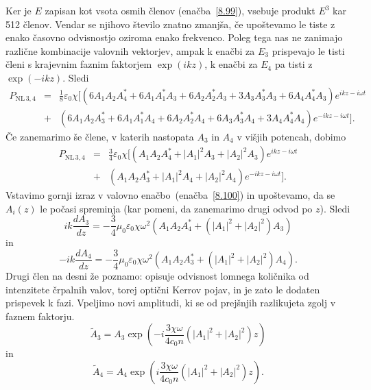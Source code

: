 Ker je $E$ zapisan kot vsota osmih členov
(enačba~\ref{8.99}), vsebuje produkt $E^3$ kar 512 členov. Vendar se njihovo število znatno zmanjša, 
če upoštevamo le tiste z enako časovno odvisnostjo oziroma enako frekvenco.
Poleg tega nas ne zanimajo različne kombinacije valovnih vektorjev, ampak k enačbi za $E_{3}$ 
prispevajo le tisti členi s krajevnim faznim faktorjem $\exp(ikz)$, 
k enačbi za $E_4$ pa tisti z $\exp(-ikz)$. Sledi
\begin{eqnarray}
P_{\mathrm{NL}\,3,4} &=& \frac{1}{8}\varepsilon_0\chi [
\left(6 A_1 A_2 A_4^*+ 6A_1 A_1^*A_3 + 6A_2A_2^*A_3 + 3 A_3A_3^*A_3 + 6 A_4 A_4^* A_3\right)
e^{i k z - i\omega t} \nonumber\\
&+& 
\left(6 A_1 A_2 A_3^*+6 A_1 A_1^*A_4 + 6A_2A_2^*A_4 + 6 A_3A_3^*A_4 + 3 A_4 A_4^* A_4\right)
e^{-i k z - i\omega t}].
\end{eqnarray}
Če zanemarimo še člene, v katerih nastopata $A_3$ in $A_4$ v višjih potencah, dobimo
\begin{eqnarray}
P_{\mathrm{NL}\,3,4} &=& \frac{3}{4}\varepsilon_0\chi [
\left( A_1 A_2 A_4^*+ |A_1|^2 A_3 + |A_2|^2 A_3 \right)
e^{i k z - i\omega t} \nonumber\\
&+& 
\left( A_1 A_2 A_3^*+|A_1|^2 A_4 + |A_2|^2A_4 \right)
e^{-i k z - i\omega t}].
\end{eqnarray}
Vstavimo gornji izraz v valovno enačbo~(enačba~\ref{8.100}) in upoštevamo, 
da se $A_i(z)$ le počasi 
spreminja (kar pomeni, da zanemarimo drugi odvod po $z$). Sledi 
\begin{equation}
i k \frac{dA_3}{dz} = - \frac{3}{4} \mu_0\varepsilon_0 \chi \omega^2 
\left( A_1 A_2 A_4^*+ (|A_1|^2 + |A_2|^2) A_3 \right)
\label{eq:opc1}
\end{equation}
in 
\begin{equation}
-i k \frac{dA_4}{dz} = - \frac{3}{4} \mu_0\varepsilon_0 \chi \omega^2 
\left( A_1 A_2 A_3^*+ (|A_1|^2 + |A_2|^2) A_4 \right).
\label{eq:opc2}
\end{equation}
Drugi člen na desni že poznamo: opisuje odvisnost lomnega količnika
od intenzitete črpalnih valov, torej optični Kerrov
pojav, in je zato le dodaten prispevek
k fazi. Vpeljimo novi amplitudi, ki se od prejšnjih razlikujeta zgolj v faznem faktorju.
\begin{equation}
\tilde{A}_3 = A_3 \exp\left(-i\frac{ 3 \chi \omega}{4 c_0 n}(|A_1|^2 + |A_2|^2) z\right)
\end{equation}
in 
\begin{equation}
\tilde{A}_4 = A_4 \exp\left(i\frac{ 3 \chi \omega}{4 c_0 n}(|A_1|^2 + |A_2|^2)z\right).
\end{equation}
